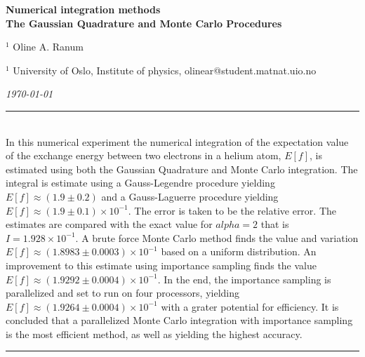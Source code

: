 \documentclass[%
reprint,
amsmath,amssymb,
aps,
]{revtex4-1}
\newcommand{\HRule}{\rule{\textwidth}{0.5mm}}
\begin{document}
\onecolumngrid

\begin{center}
	\large\textbf{Numerical integration methods\\ \small{The Gaussian Quadrature and Monte Carlo Procedures}}
\end{center}
\vspace{5mm}

\begin{center}
	\small{$^1$ Oline A. Ranum}\\
\end{center}

\begin{center}
	\small{$^1$ University of Oslo, Institute of physics, 
		olinear@student.matnat.uio.no}
\end{center}

\begin{center}
	\textit{\today}
\end{center}
\vspace{7mm}
\noindent 
\HRule \\
In this numerical experiment the numerical integration of the expectation value of the exchange energy between two electrons in a helium atom, $E[f]$, is estimated using both the Gaussian Quadrature and Monte Carlo integration. The integral is estimate using a Gauss-Legendre procedure yielding $E[f] \approx (1.9 \pm 0.2)$ and a Gauss-Laguerre procedure yielding $E[f]\approx (1.9 \pm 0.1)\times 10^{-1}$. The error is taken to be the relative error. The estimates are compared with the exact value for $alpha = 2$ that is $I = 1.928\times 10^{-1}$. A brute force Monte Carlo method finds the value and variation $E[f]\approx (1.8983 \pm 0.0003)\times 10^{-1}$ based on a uniform distribution. An improvement to this estimate using importance sampling finds the value $E[f]\approx (1.9292 \pm 0.0004)\times 10^{-1}$. In the end, the importance sampling is parallelized and set to run on four processors, yielding $E[f]\approx (1.9264 \pm 0.0004)\times 10^{-1}$ with a grater potential for efficiency. It is concluded that a parallelized Monte Carlo integration with importance sampling is the most efficient method, as well as yielding the highest accuracy. 
  \\
\HRule
\vspace{1cm}
\end{document}
